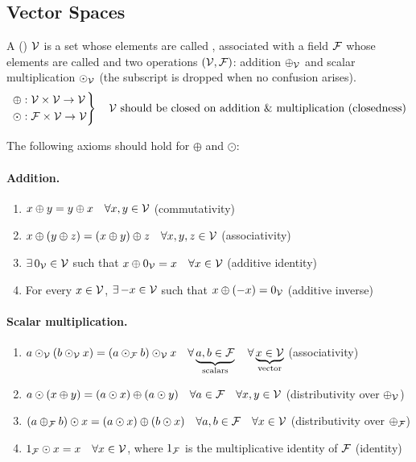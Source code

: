 \subsection{Vector Spaces}\label{ss:vector-spaces}

\begin{definition}
A  () $\mathcal{V}$ is a set whose elements are called , associated with a field $\mathcal{F}$ whose elements are called  and two operations $(\mathcal{V},\mathcal{F})$: addition $\oplus_{\mathcal{V}}$ and scalar multiplication $\odot_{\mathcal{V}}$ (the subscript is dropped when no confusion arises).
\[
\left.\begin{aligned}
\oplus &: \mathcal{V}\times\mathcal{V}\to\mathcal{V}\\
\odot &: \mathcal{F}\times\mathcal{V}\to\mathcal{V}
\end{aligned}\right\}\quad \text{$\mathcal{V}$ should be closed on addition \& multiplication (closedness)}
\]
\end{definition}

The following axioms should hold for $\oplus$ and $\odot$:

\paragraph{Addition.}
\begin{enumerate}[label=(A\arabic*),leftmargin=3.2em]
\item $x\oplus y = y\oplus x \quad \forall x,y\in\mathcal{V}$ \hfill (commutativity)
\item $x\oplus(y\oplus z) = (x\oplus y)\oplus z \quad \forall x,y,z\in\mathcal{V}$ \hfill (associativity)
\item $\exists\, 0_{\mathcal{V}}\in\mathcal{V}$ such that $x\oplus 0_{\mathcal{V}} = x \quad \forall x\in\mathcal{V}$ \hfill (additive identity)
\item For every $x\in\mathcal{V}$, $\exists\, {-x}\in\mathcal{V}$ such that $x\oplus(-x) = 0_{\mathcal{V}}$ \hfill (additive inverse)
\end{enumerate}

\paragraph{Scalar multiplication.}
\begin{enumerate}[label=(SM\arabic*),leftmargin=3.8em]
\item $a\odot_{\mathcal{V}}(b\odot_{\mathcal{V}} x) = (a\odot_{\mathcal{F}} b)\odot_{\mathcal{V}} x \quad \forall \underbrace{a,b\in\mathcal{F}}_{\text{scalars}} \quad \forall \underbrace{x\in\mathcal{V}}_{\text{vector}}$ \hfill (associativity)
\item $a\odot(x\oplus y) = (a\odot x)\oplus(a\odot y) \quad \forall a\in\mathcal{F} \quad \forall x,y\in\mathcal{V}$ \hfill (distributivity over $\oplus_{\mathcal{V}}$)
\item $(a\oplus_{\mathcal{F}} b)\odot x = (a\odot x)\oplus(b\odot x) \quad \forall a,b\in\mathcal{F} \quad \forall x\in\mathcal{V}$ \hfill (distributivity over $\oplus_{\mathcal{F}}$)
\item $1_{\mathcal{F}}\odot x = x \quad \forall x\in\mathcal{V}$, where $1_{\mathcal{F}}$ is the multiplicative identity of $\mathcal{F}$ \hfill (identity)
\end{enumerate}

